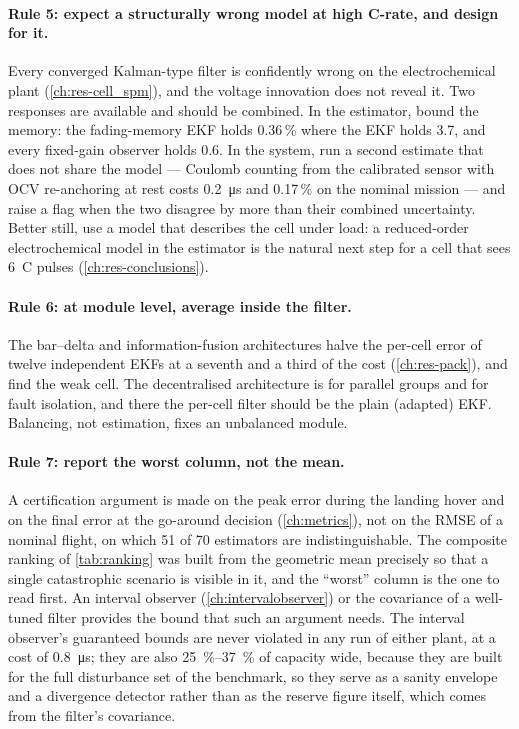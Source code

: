 \paragraph{Rule 5: expect a structurally wrong model at high C-rate, and design for it.}
Every converged Kalman-type filter is confidently wrong on the electrochemical plant
(\cref{ch:res-cell_spm}), and the voltage innovation does not reveal it. Two responses are
available and should be combined. In the estimator, bound the memory: the fading-memory EKF
holds \num{0.36}\,\% where the EKF holds \num{3.7}, and every fixed-gain observer holds
\num{0.6}. In the system, run a second estimate that does not share the model --- Coulomb
counting from the calibrated sensor with OCV re-anchoring at rest costs
\SI{0.2}{\micro\second} and \num{0.17}\,\% on the nominal mission --- and raise a flag when the
two disagree by more than their combined uncertainty. Better still, use a model that describes
the cell under load: a reduced-order electrochemical model in the estimator is the natural
next step for a cell that sees \SI{6}{C} pulses (\cref{ch:res-conclusions}).

\paragraph{Rule 6: at module level, average inside the filter.} The bar--delta and
information-fusion architectures halve the per-cell error of twelve independent EKFs at a
seventh and a third of the cost (\cref{ch:res-pack}), and find the weak cell. The decentralised
architecture is for parallel groups and for fault isolation, and there the per-cell filter
should be the plain (adapted) EKF. Balancing, not estimation, fixes an unbalanced module.

\paragraph{Rule 7: report the worst column, not the mean.} A certification argument is made on
the peak error during the landing hover and on the final error at the go-around decision
(\cref{ch:metrics}), not on the RMSE of a nominal flight, on which 51 of 70 estimators are
indistinguishable. The composite ranking of \cref{tab:ranking} was built from the geometric
mean precisely so that a single catastrophic scenario is visible in it, and the ``worst''
column is the one to read first. An interval observer (\cref{ch:intervalobserver}) or the
covariance of a well-tuned filter provides the bound that such an argument needs. The interval
observer's guaranteed bounds are never violated in any run of either plant, at a cost of
\SI{0.8}{\micro\second}; they are also \SIrange{25}{37}{\percent} of capacity wide, because
they are built for the full disturbance set of the benchmark, so they serve as a sanity
envelope and a divergence detector rather than as the reserve figure itself, which comes from
the filter's covariance.

